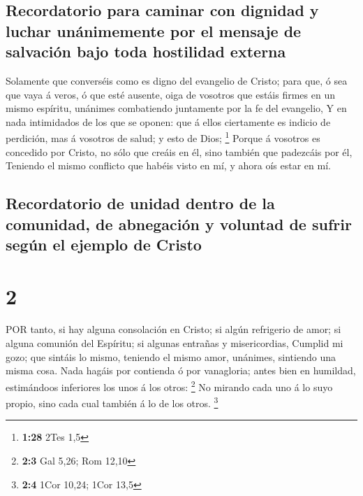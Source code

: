 \hypertarget{recordatorio-para-caminar-con-dignidad-y-luchar-unuxe1nimemente-por-el-mensaje-de-salvaciuxf3n-bajo-toda-hostilidad-externa}{%
\subsection{Recordatorio para caminar con dignidad y luchar unánimemente
por el mensaje de salvación bajo toda hostilidad
externa}\label{recordatorio-para-caminar-con-dignidad-y-luchar-unuxe1nimemente-por-el-mensaje-de-salvaciuxf3n-bajo-toda-hostilidad-externa}}

 Solamente que converséis como es digno del evangelio de
Cristo; para que, ó sea que vaya á veros, ó que esté ausente, oiga de
vosotros que estáis firmes en un mismo espíritu, unánimes combatiendo
juntamente por la fe del evangelio,  Y en nada intimidados
de los que se oponen: que á ellos ciertamente es indicio de perdición,
mas á vosotros de salud; y esto de Dios; \footnote{\textbf{1:28} 2Tes
  1,5}  Porque á vosotros es concedido por Cristo, no sólo
que creáis en él, sino también que padezcáis por él, 
Teniendo el mismo conflicto que habéis visto en mí, y ahora oís estar en
mí.

\hypertarget{recordatorio-de-unidad-dentro-de-la-comunidad-de-abnegaciuxf3n-y-voluntad-de-sufrir-seguxfan-el-ejemplo-de-cristo}{%
\subsection{Recordatorio de unidad dentro de la comunidad, de abnegación
y voluntad de sufrir según el ejemplo de
Cristo}\label{recordatorio-de-unidad-dentro-de-la-comunidad-de-abnegaciuxf3n-y-voluntad-de-sufrir-seguxfan-el-ejemplo-de-cristo}}

\hypertarget{section-1}{%
\section{2}\label{section-1}}

 POR tanto, si hay alguna consolación en Cristo; si algún
refrigerio de amor; si alguna comunión del Espíritu; si algunas entrañas
y misericordias,  Cumplid mi gozo; que sintáis lo mismo,
teniendo el mismo amor, unánimes, sintiendo una misma cosa. 
Nada hagáis por contienda ó por vanagloria; antes bien en humildad,
estimándoos inferiores los unos á los otros: \footnote{\textbf{2:3} Gal
  5,26; Rom 12,10}  No mirando cada uno á lo suyo propio,
sino cada cual también á lo de los otros. \footnote{\textbf{2:4} 1Cor
  10,24; 1Cor 13,5}

